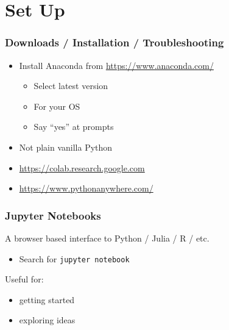 \section{Set Up}







\begin{frame}
    \frametitle{Downloads / Installation / Troubleshooting}

    
    \begin{itemize}
        \item Install Anaconda from {\footnotesize \url{https://www.anaconda.com/}}
        \vspace{1em}
            \begin{itemize}
                \item Select latest version 
                \item For your OS
                \item Say ``yes'' at prompts
            \end{itemize}
        \vspace{1em}
        \item Not plain vanilla Python
    \end{itemize}


    \vspace{1em}


    \begin{itemize}
        \item \url{https://colab.research.google.com}
        \item \url{https://www.pythonanywhere.com/}
    \end{itemize}


\end{frame}



\begin{frame}
    \frametitle{Jupyter Notebooks}

    A browser based interface to Python / Julia / R / etc.


    \vspace{2em}

    \begin{itemize}
        \item Search for \texttt{jupyter notebook}
    \end{itemize}

    \vspace{2em}

    Useful for:

    \begin{itemize}
        \item getting started
        \item exploring ideas
    \end{itemize}





\end{frame}



